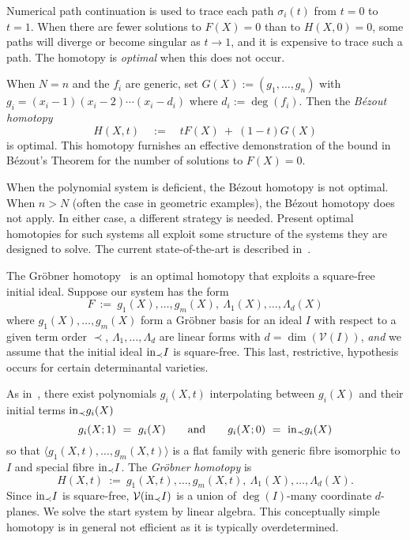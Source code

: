 Numerical path continuation is used to trace each path
$\sigma_i(t)$ from $t=0$ to $t=1$.
When there are fewer solutions to $F(X)=0$ than to 
$H(X,0)=0$, some paths will diverge or become singular as
$t\rightarrow 1$, and it is expensive to trace such a path.
The homotopy is {\it optimal} when this does not
occur. 

When $N=n$ and the $f_i$ are generic, set
$G(X):=(g_1,\ldots,g_n)$ with $g_i=(x_i-1)(x_i-2)\cdots(x_i-d_i)$
where $d_i:=\deg(f_i)$.
Then the {\it B\'ezout homotopy} 
$$
  H(X,t)\quad :=\quad tF(X)\ +\ 
  (1-t)G(X)
$$
is optimal.
This homotopy furnishes an effective demonstration of
the bound in B\'ezout's Theorem for the number of
solutions to $F(X)=0$.

When the polynomial system is deficient, the B\'ezout homotopy is not optimal.
When $n>N$ (often the case in geometric examples), 
the B\'ezout homotopy  does not apply.
In either case, a different strategy is needed.
Present optimal homotopies for such systems all exploit some structure of
the systems they are designed to solve.
The current state-of-the-art is described in~\cite{SO:Ver99}.

\begin{example}\label{example:Groebner}
The Gr\"obner homotopy~\cite{SO:HSS} is an optimal 
homotopy\index{homotopy!optimal} that exploits a square-free initial
ideal\index{initial ideal!square-free}.
Suppose our system has the form
$$
  F\ :=\ g_1(X),\ldots,g_m(X),\ \Lambda_1(X),\ldots,\Lambda_d(X)
$$
where $g_1(X),\ldots,g_m(X)$ form a Gr\"obner basis for an ideal $I$ 
with respect to a given term order $\prec$, $\Lambda_1,\ldots,\Lambda_d$ are
linear forms with $d=\dim({\mathcal V}(I))$, {\it and}\/ we assume that 
the initial ideal ${\rm in}_\prec I$ is square-free.
This last, restrictive, hypothesis occurs for
certain determinantal varieties.

As in~\cite[Chapter 15]{SO:MR97a:13001}, there exist polynomials
$g_i(X,t)$ interpolating between $g_i(X)$ and their initial terms
${\rm in}_\prec g_i(X)$
$$
  g_i(X;1)\ =\ g_i(X) \qquad\mbox{and}\qquad
  g_i(X;0) \ =\ {\rm in}_\prec g_i(X)
$$
so that $\langle g_1(X,t),\ldots,g_m(X,t)\rangle$ is a flat family
with generic fibre isomorphic to $I$ and special fibre 
${\rm in}_\prec I$.
The {\it Gr\"obner homotopy} is
$$
  H(X,t)\ :=\ 
  g_1(X,t),\ldots,g_m(X,t),\ \Lambda_1(X),\ldots,\Lambda_d(X).
$$
Since ${\rm in}_\prec I$ is square-free, 
${\mathcal V}({\rm in}_\prec I)$ is a union of 
$\deg(I)$-many coordinate $d$-planes.
We solve the start system by linear algebra.
This conceptually simple homotopy is in general not
efficient as it is typically overdetermined.
\end{example}

